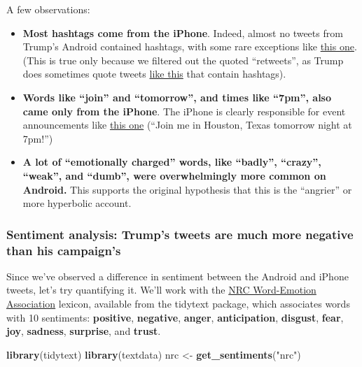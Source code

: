 \documentclass[
]{article}
\newenvironment{Shaded}{\begin{snugshade}}{\end{snugshade}}
\newcommand{\KeywordTok}[1]{\textcolor[rgb]{0.13,0.29,0.53}{\textbf{#1}}}
\newcommand{\NormalTok}[1]{#1}
\newcommand{\StringTok}[1]{\textcolor[rgb]{0.31,0.60,0.02}{#1}}
\begin{document}
A few observations:

\begin{itemize}
\item
  \textbf{Most hashtags come from the iPhone}. Indeed, almost no tweets
  from Trump's Android contained hashtags, with some rare exceptions
  like
  \href{https://twitter.com/realDonaldTrump/status/753960134422900736}{this
  one}. (This is true only because we filtered out the quoted
  ``retweets'', as Trump does sometimes quote tweets
  \href{https://twitter.com/realDonaldTrump/status/731805331425218560}{like
  this} that contain hashtags).
\item
  \textbf{Words like ``join'' and ``tomorrow'', and times like ``7pm'',
  also came only from the iPhone}. The iPhone is clearly responsible for
  event announcements like
  \href{https://twitter.com/realDonaldTrump/status/743522630230228993}{this
  one} (``Join me in Houston, Texas tomorrow night at 7pm!'')
\item
  \textbf{A lot of ``emotionally charged'' words, like ``badly'',
  ``crazy'', ``weak'', and ``dumb'', were overwhelmingly more common on
  Android.} This supports the original hypothesis that this is the
  ``angrier'' or more hyperbolic account.
\end{itemize}

\hypertarget{sentiment-analysis-trumps-tweets-are-much-more-negative-than-his-campaigns}{%
\subsubsection{Sentiment analysis: Trump's tweets are much more negative
than his
campaign's}\label{sentiment-analysis-trumps-tweets-are-much-more-negative-than-his-campaigns}}

Since we've observed a difference in sentiment between the Android and
iPhone tweets, let's try quantifying it. We'll work with the
\href{http://saifmohammad.com/WebPages/NRC-Emotion-Lexicon.htm}{NRC
Word-Emotion Association} lexicon, available from the tidytext package,
which associates words with 10 sentiments: \textbf{positive},
\textbf{negative}, \textbf{anger}, \textbf{anticipation},
\textbf{disgust}, \textbf{fear}, \textbf{joy}, \textbf{sadness},
\textbf{surprise}, and \textbf{trust}.

\begin{Shaded}
\begin{Highlighting}[]
\KeywordTok{library}\NormalTok{(tidytext)}
\KeywordTok{library}\NormalTok{(textdata)}
\NormalTok{nrc <-}\StringTok{ }\KeywordTok{get_sentiments}\NormalTok{(}\StringTok{"nrc"}\NormalTok{)}
\end{Highlighting}
\end{Shaded}
\end{document}
